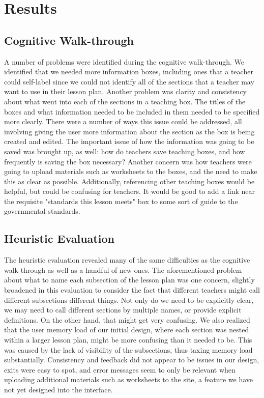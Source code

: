 \documentclass[10pt,letter,titlepage]{article}
\begin{document}
\section{Results}
\subsection{Cognitive Walk-through}
A number of problems were identified during the cognitive walk-through.  We
identified that we needed more information boxes, including ones that a teacher
could self-label since we could not identify all of the sections that a teacher
may want to use in their lesson plan.  Another problem was clarity and
consistency about what went into each of the sections in a teaching box.  The
titles of the boxes and what information needed to be included in them needed to
be specified more clearly.  There were a number of ways this issue could be
addressed, all involving giving the user more information about the section as
the box is being created and edited.  The important issue of how the information
was going to be saved was brought up, as well: how do teachers save teaching
boxes, and how frequently is saving the box necessary?  Another concern was how
teachers were going to upload materials such as worksheets to the boxes, and the
need to make this as clear as possible.  Additionally, referencing other
teaching boxes would be helpful, but could be confusing for teachers.  It would
be good to add a link near the requisite "standards this lesson meets" box to
some sort of guide to the governmental standards.

\subsection{Heuristic Evaluation}
The heuristic evaluation revealed many of the same difficulties as the cognitive
walk-through as well as a handful of new ones.  The aforementioned problem about
what to name each subsection of the lesson plan was one concern, slightly
broadened in this evaluation to consider the fact that different teachers might
call different subsections different things.  Not only do we need to be
explicitly clear, we may need to call different sections by multiple names, or
provide explicit definitions.  On the other hand, that might get very confusing.
We also realized that the user memory load of our initial design, where each
section was nested within a larger lesson plan, might be more confusing than it
needed to be.  This was caused by the lack of visibility of the subsections,
thus taxing memory load substantially.  Consistency and feedback did not appear
to be issues in our design, exits were easy to spot, and error messages seem to
only be relevant when uploading additional materials such as worksheets to the
site, a feature we have not yet designed into the interface.
\end{document}
